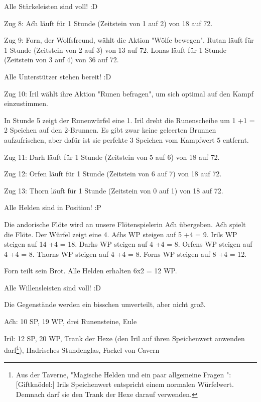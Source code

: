 \documentclass[10pt, a4paper, oneside]{book}
\begin{document}
{Alle Stärkeleisten sind voll! :D



Zug 8: Aćh läuft für 1 Stunde (Zeitstein von 1 auf 2) von 18 auf 72.



Zug 9: Forn, der Wolfsfreund, wählt die Aktion "Wölfe bewegen". Rutan läuft für 1 Stunde (Zeitstein von 2 auf 3) von 13 auf 72. Lonas läuft für 1 Stunde (Zeitstein von 3 auf 4) von 36 auf 72.

Alle Unterstützer stehen bereit! :D



Zug 10: Iril wählt ihre Aktion "Runen befragen", um sich optimal auf den Kampf einzustimmen.

In Stunde 5 zeigt der Runenwürfel eine 1. Iril dreht die Runenscheibe um 1 +1 = 2 Speichen auf den 2-Brunnen. Es gibt zwar keine geleerten Brunnen aufzufrischen, aber dafür ist sie perfekte 3 Speichen vom Kampfwert 5 entfernt.



Zug 11: Darh läuft für 1 Stunde (Zeitstein von 5 auf 6) von 18 auf 72.



Zug 12: Orfen läuft für 1 Stunde (Zeitstein von 6 auf 7) von 18 auf 72.



Zug 13: Thorn läuft für 1 Stunde (Zeitstein von 0 auf 1) von 18 auf 72.

Alle Helden sind in Position! :P



Die andorische Flöte wird an unsere Flötenspielerin Aćh übergeben. Aćh spielt die Flöte. Der Würfel zeigt eine 4. Aćhs WP steigen auf 5 +4 = 9. Irils WP steigen auf 14 +4 = 18. Darhs WP steigen auf 4 +4 = 8. Orfens WP steigen auf 4 +4 = 8. Thorns WP steigen auf 4 +4 = 8. Forns WP steigen auf 8 +4 = 12.

Forn teilt sein Brot. Alle Helden erhalten 6x2 = 12 WP.

Alle Willensleisten sind voll! :D



Die Gegenstände werden ein bisschen umverteilt, aber nicht groß.

Aćh: 10 SP, 19 WP, drei Runensteine, Eule

Iril: 12 SP, 20 WP, Trank der Hexe (den Iril auf ihren Speichenwert anwenden darf\footnote{Aus der Taverne, "Magische Helden und ein paar allgemeine Fragen
": [Giftknödel:] Irils Speichenwert entspricht einem normalen Würfelwert. Demnach darf sie den Trank der Hexe darauf verwenden.}), Hadrisches Stundenglas, Fackel von Cavern

}
\end{document}
